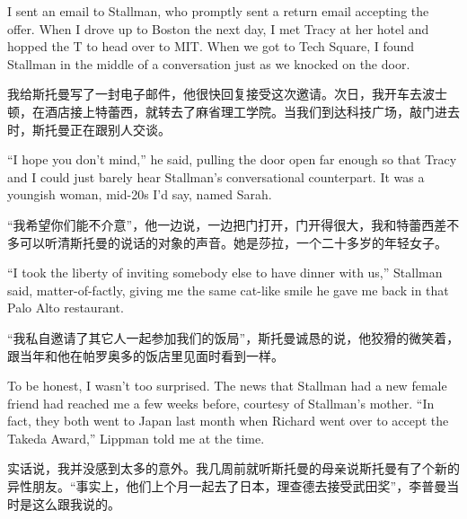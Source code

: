 \ifdefined\eng
I sent an email to Stallman, who promptly sent a return email accepting the offer. When I drove up to Boston the next day, I met Tracy at her hotel and hopped the T to head over to MIT. When we got to Tech Square, I found Stallman in the middle of a conversation just as we knocked on the door.
\fi

\ifdefined\chs
我给斯托曼写了一封电子邮件，他很快回复接受这次邀请。次日，我开车去波士顿，在酒店接上特蕾西，就转去了麻省理工学院。当我们到达科技广场，敲门进去时，斯托曼正在跟别人交谈。
\fi

\ifdefined\eng
``I hope you don't mind,'' he said, pulling the door open far enough so that Tracy and I could just barely hear Stallman's conversational counterpart. It was a youngish woman, mid-20s I'd say, named Sarah.
\fi

\ifdefined\chs
``我希望你们能不介意''，他一边说，一边把门打开，门开得很大，我和特蕾西差不多可以听清斯托曼的说话的对象的声音。她是莎拉，一个二十多岁的年轻女子。
\fi

\ifdefined\eng
``I took the liberty of inviting somebody else to have dinner with us,'' Stallman said, matter-of-factly, giving me the same cat-like smile he gave me back in that Palo Alto restaurant.
\fi

\ifdefined\chs
``我私自邀请了其它人一起参加我们的饭局''，斯托曼诚恳的说，他狡猾的微笑着，跟当年和他在帕罗奥多的饭店里见面时看到一样。
\fi

\ifdefined\eng
To be honest, I wasn't too surprised. The news that Stallman had a new female friend had reached me a few weeks before, courtesy of Stallman's mother. ``In fact, they both went to Japan last month when Richard went over to accept the Takeda Award,'' Lippman told me at the time.
\fi

\ifdefined\chs
实话说，我并没感到太多的意外。我几周前就听斯托曼的母亲说斯托曼有了个新的异性朋友。``事实上，他们上个月一起去了日本，理查德去接受武田奖''，李普曼当时是这么跟我说的。
\fi

